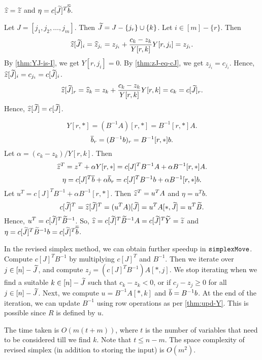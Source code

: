 \begin{lemma}
\label{thm:upd-z}
$\widehat{z} = \widetilde{z}$ and $\eta = c[\widetilde{J}]^T\overline{\widetilde{b}}$.
\end{lemma}
\begin{longProof}
Let $J = [j_1, j_2, \ldots, j_m]$. Then $\widetilde{J} = J - \{j_r\} \cup \{k\}$.
Let $i \in [m] - \{r\}$. Then
\[ \widehat{z}[\widetilde{J}]_i = \widehat{z}_{j_i} = z_{j_i} + \frac{c_k - z_k}{Y[r,k]} Y[r,j_i] = z_{j_i}. \]
By \cref{thm:YJ-is-I}, we get $Y[r,j_i] = 0$.
By \cref{thm:zJ-eq-cJ}, we get $z_{j_i} = c_{j_i}$.
Hence, $\widehat{z}[\widetilde{J}]_i = c_{j_i} = c[\widetilde{J}]_i$.
\[ \widehat{z}[\widetilde{J}]_r = \widehat{z}_k = z_k + \frac{c_k - z_k}{Y[r,k]} Y[r,k] = c_k = c[\widetilde{J}]_r. \]
Hence, $\widehat{z}[\widetilde{J}] = c[\widetilde{J}]$.

\[ Y[r,*] = (B^{-1}A)[r,*] = B^{-1}[r,*]A. \]
\[ \overline{b}_r = (B^{-1}b)_r = B^{-1}[r,*]b. \]
Let $\alpha = (c_k - z_k)/Y[r,k]$. Then
\[ \widehat{z}^T = z^T + \alpha Y[r,*] = c[J]^TB^{-1}A + \alpha B^{-1}[r,*]A. \]
\[ \eta = c[J]^T\overline{b} + \alpha \overline{b}_r = c[J]^TB^{-1}b + \alpha B^{-1}[r,*]b. \]
Let $u^T = c[J]^TB^{-1} + \alpha B^{-1}[r,*]$. Then $\widehat{z}^T = u^TA$ and $\eta = u^Tb$.
\[ c[\widetilde{J}]^T = \widehat{z}[\widetilde{J}]^T = (u^TA)[\widetilde{J}] = u^TA[*,\widetilde{J}] = u^T\widetilde{B}. \]
Hence, $u^T = c[\widetilde{J}]^T\widetilde{B}^{-1}$.
So, $\widehat{z} = c[\widetilde{J}]^T\widetilde{B}^{-1}A = c[\widetilde{J}]^T\widetilde{Y} = \widetilde{z}$
and $\eta = c[\widetilde{J}]^T\widetilde{B}^{-1}b = c[\widetilde{J}]^T\overline{\widetilde{b}}$.
\end{longProof}

In the revised simplex method, we can obtain further speedup in $\operatorname{\mathtt{simplexMove}}$.
Compute $c[J]^TB^{-1}$ by multiplying $c[J]^T$ and $B^{-1}$.
Then we iterate over $j \in [n] - \widetilde{J}$, and compute $z_j = (c[J]^TB^{-1})A[*,j]$.
We stop iterating when we find a suitable $k \in [n] - \widetilde{J}$ such that $c_k - z_k < 0$,
or if $c_j - z_j \ge 0$ for all $j \in [n] - \widetilde{J}$.
Next, we compute $u = B^{-1}A[*,k]$ and $\overline{b} = B^{-1}b$.
At the end of the iteration, we can update $B^{-1}$ using row operations as per \cref{thm:upd-Y}.
This is possible since $R$ is defined by $u$.

The time taken is $O(m(t+m))$, where $t$ is the number of variables
that need to be considered till we find $k$. Note that $t \le n-m$.
The space complexity of revised simplex (in addition to storing the input) is $O(m^2)$.


